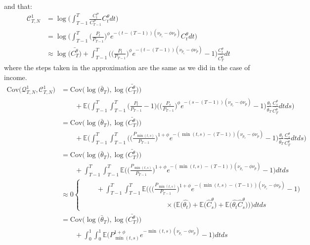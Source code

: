 and that:
\begin{align*}
\mathcal{C}^1_{T,N} &= \log \Bigg(  \int_{T-1}^{T} \frac{C^P_t}{C^P_{T-1}} C^{\theta}_t dt\Bigg) \\
&= \log \Bigg(  \int_{T-1}^{T} \Big(\frac{P_t}{P_{T-1}}\Big)^{\phi} e^{-(t-(T-1))(\nu_{p_c}-\phi \nu_p)} C^{\theta}_t dt\Bigg) \\
&\approx \log \Big( \bar{C^{\theta}_T} \Big) + \int_{T-1}^{T} \Big( \Big(\frac{P_t}{P_{T-1}}\Big)^{\phi}e^{-(t-(T-1))(\nu_{p_c}-\phi \nu_p)}-1\Big)\frac{C^{\theta}_t}{\bar{C^{\theta}_T}} dt 
\end{align*}
where the steps taken in the approximation are the same as we did in the case of income.
\begin{align*}
\mathrm{Cov}\Big(\mathcal{Q}^1_{T,N},\mathcal{C}^1_{T,N} \Big) 
&=\mathrm{Cov}\Big( \log \Big( \bar{\theta}_T \Big), \log \Big( \bar{C^{\theta}_T} \Big) \Big) \\
& \qquad + \mathbb{E} \Bigg(\int_{T-1}^{T} \int_{T-1}^{T} \Big(\frac{P_t}{P_{T-1}}-1\Big)\Big( \Big(\frac{P_s}{P_{T-1}}\Big)^{\phi}e^{-(s-(T-1))(\nu_{p_c}-\phi \nu_p)}-1\Big)\frac{\theta_t}{\bar{\theta}_T} \frac{C^{\theta}_s}{\bar{C^{\theta}_T}} dt ds \Bigg) \\
&=\mathrm{Cov}\Big( \log \Big( \bar{\theta}_T \Big), \log \Big( \bar{C^{\theta}_T} \Big) \Big) \\
& \qquad + \mathbb{E} \Bigg(\int_{T-1}^{T} \int_{T-1}^{T} \Big( \Big(\frac{P_{\min(t,s)}}{P_{T-1}}\Big)^{1+\phi}e^{-(\min(t,s)-(T-1))(\nu_{p_c}-\phi \nu_p)}-1\Big)\frac{\theta_t}{\bar{\theta}_T} \frac{C^{\theta}_s}{\bar{C^{\theta}_T}} dt ds \Bigg) \\
&=\mathrm{Cov}\Big( \log \Big( \bar{\theta}_T \Big), \log \Big( \bar{C^{\theta}_T} \Big) \Big) \\
& \qquad +  \int_{T-1}^{T} \int_{T-1}^{T} \mathbb{E}\Big( \Big(\frac{P_{\min(t,s)}}{P_{T-1}}\Big)^{1+\phi}e^{-(\min(t,s)-(T-1))(\nu_{p_c}-\phi \nu_p)}-1\Big) dt ds  \\
& \approx 0
\begin{cases}
 \qquad +  \int_{T-1}^{T} \int_{T-1}^{T} \mathbb{E}\Bigg(\Big( \Big(\frac{P_{\min(t,s)}}{P_{T-1}}\Big)^{1+\phi}e^{-(\min(t,s)-(T-1))(\nu_{p_c}-\phi \nu_p)}-1\Big) \\
  \qquad \qquad \qquad \qquad \qquad \qquad \times \Big(\mathbb{E}\Big(\hat{\theta_t}\Big)  + \mathbb{E}\Big(\hat{C}^{\theta}_s \Big) + \mathbb{E}\Big(\hat{\theta_t} \hat{C}^{\theta}_s\Big)\Big)\Bigg) dt ds 
 \end{cases} \\
 &= \mathrm{Cov}\Big( \log \Big( \bar{\theta}_T \Big), \log \Big( \bar{C^{\theta}_T} \Big) \Big) \\
 & \qquad +  \int_{0}^{1} \int_{0}^{1} \mathbb{E}\Big( P_{\min(t,s)}^{1+\phi}e^{-\min(t,s)(\nu_{p_c}-\phi \nu_p)}-1\Big) dt ds
\end{align*}
